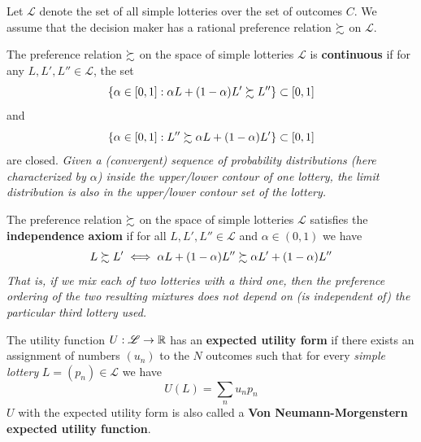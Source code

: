 \documentclass{report}
\begin{document}
	 		\begin{assumption}
	 			Let $\mathscr{L}$ denote the set of all simple lotteries over the set of outcomes $C$. We assume that the decision maker has a rational preference relation $\succsim$ on $\mathscr{L}$.
	 		\end{assumption}
	 		
	 		\begin{definition}[6.B.3]
	 			The preference relation $\succsim$ on the space of simple lotteries $\mathscr{L}$ is \textbf{continuous} if for any $L, L', L'' \in \mathscr{L}$, the set
	 			\begin{equation}
	 				\left\{\alpha \in[0,1] : \alpha L + (1-\alpha) L' \succsim L''\right\} \subset[0,1]
	 			\end{equation}
	 			and 
	 			\begin{equation}
	 				\left\{\alpha \in[0,1] : L'' \succsim \alpha L + (1-\alpha) L'\right\} \subset[0,1]
	 			\end{equation}
	 			are closed. \emph{Given a (convergent) sequence of probability distributions (here characterized by $\alpha$) inside the upper/lower contour of one lottery, the limit distribution is also in the upper/lower contour set of the lottery.}
	 		\end{definition}
	 		
	 		\begin{definition}[6.B.4]
	 			The preference relation $\succsim$ on the space of simple lotteries $\mathscr{L}$ satisfies the \textbf{independence axiom} if for all $L, L', L'' \in \mathscr{L}$ and $\alpha \in (0, 1)$ we have
	 			\begin{equation}
	 				L \succsim L' \iff \alpha L + (1 - \alpha) L'' \succsim \alpha L' + (1 - \alpha) L'' 
	 			\end{equation}
	 			\emph{That is, if we mix each of two lotteries with a third one, then the preference ordering of the two resulting mixtures does not depend on (is independent of) the particular third lottery used.}
	 		\end{definition}
	 		
	 		\begin{definition}[6.B.5]
	 			The utility function $U: \mathscr{L} \to \mathbb{R}$ has an \textbf{expected utility form} if there exists an assignment of numbers $(u_n)$ to the $N$ outcomes such that for every \emph{simple lottery} $L = (p_n) \in \mathscr{L}$ we have
	 			\begin{equation}
	 				U(L) = \sum_n u_n p_n
	 			\end{equation}
	 			$U$ with the expected utility form is also called a \textbf{Von Neumann-Morgenstern expected utility function}.
	 		\end{definition}
	 		
\end{document}
